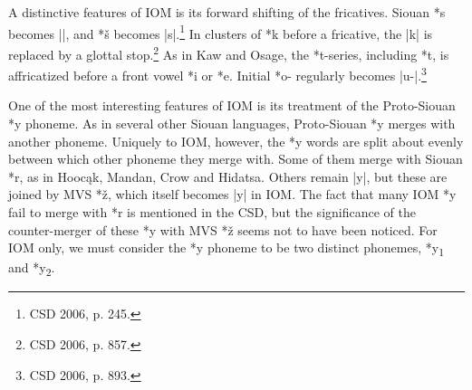 \documentclass[output=paper]{LSP/langsci}
\begin{document}
A distinctive features of IOM is its forward shifting of the fricatives.  Siouan *s becomes ||, and *\v{s} becomes |s|.\footnote{CSD 2006, p. 245. } In clusters of *k before a fricative, the |k| is replaced by a glottal stop.\footnote{CSD 2006, p. 857.}  As in Kaw and Osage, the *t-series, including *t\textsuperscript{}, is affricatized before a front vowel *i or *e.  Initial *o- regularly becomes |u-|.\footnote{CSD 2006, p. 893.}

One of the most interesting features of IOM is its treatment of the Proto-Siouan *y phoneme.  As in several other Siouan languages, Proto-Siouan *y merges with another phoneme.  Uniquely to IOM, however, the *y words are split about evenly between which other phoneme they merge with.  Some of them merge with Siouan *r, as in Hooc\k{a}k, Mandan, Crow and Hidatsa.  Others remain |y|, but these are joined by MVS *\v{z}, which itself becomes |y| in IOM.  The fact that many IOM *y fail to merge with *r is mentioned in the CSD, but the significance of the counter-merger of these *y with MVS *\v{z} seems not to have been noticed.  For IOM only, we must consider the *y phoneme to be two distinct phonemes, *y\textsubscript{1} and *y\textsubscript{2}.
\end{document}
